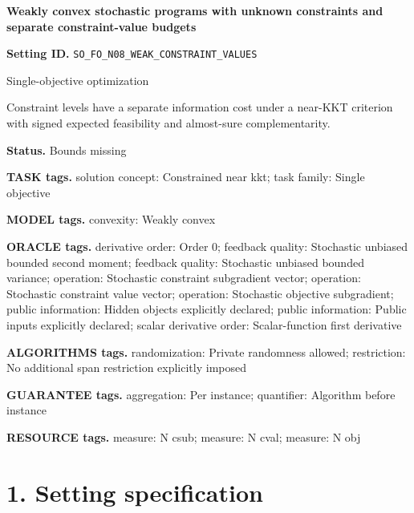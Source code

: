 \documentclass[10pt,a4paper]{article}
\begin{document}
\raggedright

{\LARGE\bfseries\sffamily\color{AtlasNavy} Weakly convex stochastic programs with unknown constraints and separate constraint-value budgets\par}\vspace{5pt}


\textbf{Setting ID.} \texttt{SO\_\allowbreak{}FO\_\allowbreak{}N08\_\allowbreak{}WEAK\_\allowbreak{}CONSTRAINT\_\allowbreak{}VALUES}



Single-objective optimization



Constraint levels have a separate information cost under a near-KKT criterion with signed expected feasibility and almost-sure complementarity.



\textbf{Status.} Bounds missing



\textbf{TASK tags.} solution concept: Constrained near kkt; task family: Single objective



\textbf{MODEL tags.} convexity: Weakly convex



\textbf{ORACLE tags.} derivative order: Order 0; feedback quality: Stochastic unbiased bounded second moment; feedback quality: Stochastic unbiased bounded variance; operation: Stochastic constraint subgradient vector; operation: Stochastic constraint value vector; operation: Stochastic objective subgradient; public information: Hidden objects explicitly declared; public information: Public inputs explicitly declared; scalar derivative order: Scalar-function first derivative



\textbf{ALGORITHMS tags.} randomization: Private randomness allowed; restriction: No additional span restriction explicitly imposed



\textbf{GUARANTEE tags.} aggregation: Per instance; quantifier: Algorithm before instance



\textbf{RESOURCE tags.} measure: N csub; measure: N cval; measure: N obj



\section{1. Setting specification}
\end{document}
